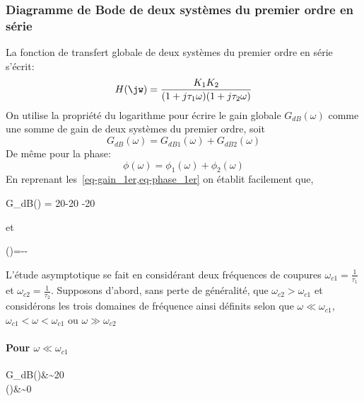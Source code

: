 \subsubsection{Diagramme de Bode de deux systèmes du premier ordre en série }
La fonction de transfert globale de deux systèmes du premier ordre en série 
s'écrit:
\begin{align}
    H(\jw)=\dfrac{K_1K_2}{(1+j\tau_1\omega)(1+j\tau_2\omega)}
    \label{eq-1er_serie}
\end{align}
On utilise la propriété du logarithme pour écrire le gain globale 
$G_{dB}(\omega)$ comme une somme de gain de deux systèmes du premier ordre, 
soit
\[
G_{dB}(\omega) = G_{dB1}(\omega) + G_{dB2}(\omega)
\]
De même pour la phase:
\[
\phi(\omega)= \phi_1(\omega) + \phi_2(\omega)
\]
En reprenant les~\cref{eq-gain_1er,eq-phase_1er} on établit facilement que,
\begin{bequation}
    G_{dB}(\omega) = 20-20
                    -20
\end{bequation}
et
\begin{bequation}
    \phi(\omega)=-\arctan{\tau_1\omega}-\arctan{\tau_2\omega}
\end{bequation}
L'étude asymptotique se fait en considérant deux fréquences de coupures 
$\omega_{c1}=\frac{1}{\tau_1}$ et $\omega_{c2}=\frac{1}{\tau_2}$.
Supposons d'abord, sans perte de généralité, que $\omega_{c2}>\omega_{c1}$ et 
considérons 
les trois domaines de fréquence ainsi définits selon que 
$\omega\ll\omega_{c1}$, $\omega_{c1}<\omega<\omega_{c1}$ ou 
$\omega\gg\omega_{c2}$
\paragraph{Pour $\omega\ll\omega_{c1}$}
\begin{bequation}
    G_{dB}(\omega)&\sim20\\
      \phi(\omega)&\sim0\degreeSI
\end{bequation}
